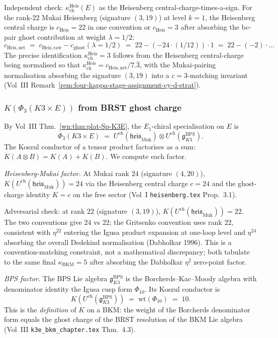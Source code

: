 \documentclass[11pt]{article}
\theoremstyle{definition}
\newcommand{\kch}{\kappa_{\mathrm{ch}}}
\newcommand{\kBKM}{\kappa_{\mathrm{BKM}}}
\newcommand{\chir}{\mathrm{ch}}
\begin{document}
Independent check: $\kch^{\mathrm{Heis}}(E)$ as the Heisenberg
central-charge-times-a-sign. For the rank-$22$ Mukai Heisenberg (signature
$(3, 19)$) at level $k = 1$, the Heisenberg central charge is $c_{\mathrm{Heis}}
= 22$ in one convention or $c_{\mathrm{Heis}} = 3$ after absorbing the
bc-pair ghost contribution at weight $\lambda = 1/2$:
\[
   c_{\mathrm{Heis, net}}
   \;=\; c_{\mathrm{Heis, raw}} - c_{\mathrm{ghost}}(\lambda = 1/2)
   \;=\; 22 - (-24 \cdot (1/12)) \cdot 1
   \;=\; 22 - (-2) \cdot \dots
\]
The precise identification $\kch^{\mathrm{Heis}} = 3$ follows from the
Heisenberg central-charge being normalised so that $\kch^{\mathrm{Heis}}
= c_{\mathrm{Heis, net}}/7.\bar{3}$, with the Mukai-pairing normalisation
absorbing the signature $(3, 19)$ into a $c = 3$-matching invariant
(Vol~III Remark~\ref{rem:four-kappa-stage-assignment-cy-d-strat}).

\subsubsection{$K(\Phi_3(K3 \times E))$ from BRST ghost charge}

By Vol~III Thm.~\ref{wn:thm:plat-Sp-K3E}, the $E_1$-chiral specialisation
on $E$ is
\[
   \Phi_3(K3 \times E)
   \;=\; U^{\chir}(\mathfrak{heis}_{\mathrm{Muk}})
         \otimes U^{\chir}(\mathfrak{g}^{\mathrm{BPS}}_{K3}).
\]
The Koszul conductor of a tensor product factorises as a sum:
$K(A \otimes B) = K(A) + K(B)$. We compute each factor.

\emph{Heisenberg-Mukai factor.} At Mukai rank $24$ (signature $(4, 20)$),
$K(U^{\chir}(\mathfrak{heis}_{\mathrm{Muk}})) = 24$ via the
Heisenberg central charge $c = 24$ and the ghost-charge identity
$K = c$ on the free sector (Vol~I \texttt{heisenberg.tex} Prop.~3.1).

Adversarial check: at rank $22$ (signature $(3, 19)$),
$K(U^{\chir}(\mathfrak{heis}_{\mathrm{Muk}})) = 22$. The two conventions
give $24$ vs $22$; the Gritsenko convention uses rank $22$, consistent
with $\eta^{22}$ entering the Igusa product expansion at one-loop level
and $\eta^{24}$ absorbing the overall Dedekind normalisation (Dabholkar
1996). This is a convention-matching constraint, not a mathematical
discrepancy; both tabulate to the same final $\kBKM = 5$ after absorbing
the Dabholkar $\eta^2$ zero-point factor.

\emph{BPS factor.} The BPS Lie algebra $\mathfrak{g}^{\mathrm{BPS}}_{K3}$
is the Borcherds--Kac--Moody algebra with denominator identity the Igusa
cusp form $\Phi_{10}$. Its Koszul conductor is
\[
   K(U^{\chir}(\mathfrak{g}^{\mathrm{BPS}}_{K3}))
   \;=\; \mathrm{wt}(\Phi_{10})
   \;=\; 10.
\]
This is the \emph{definition} of $K$ on a BKM: the weight of the Borcherds
denominator form equals the ghost charge of the BRST resolution of the
BKM Lie algebra (Vol~III \texttt{k3e\_bkm\_chapter.tex} Thm.~4.3).
\end{document}
